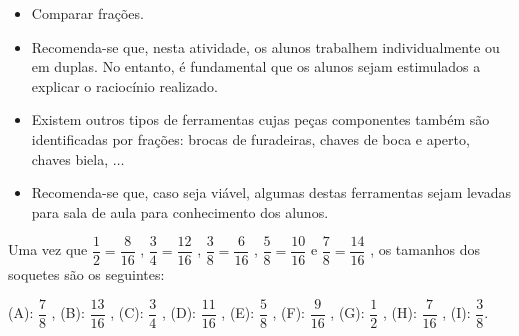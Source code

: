 \clearpage

\begin{atividade}\label{chap4-ativ14}
\objetivos
\begin{itemize} %
    \item       Comparar frações.
\end{itemize} %

\discussoes
\begin{itemize} %
    \item       Recomenda-se que, nesta atividade, os alunos trabalhem
individualmente ou em duplas. No entanto, é fundamental que os alunos sejam
estimulados a explicar o raciocínio realizado.
    \item       Existem outros tipos de ferramentas cujas peças componentes
também são identificadas por frações: brocas de furadeiras, chaves de boca e
aperto, chaves biela,       $\ldots$
    \item       Recomenda-se que, caso seja viável, algumas destas ferramentas
sejam levadas para sala de aula para conhecimento dos alunos.
\end{itemize} %

\solucao
  Uma vez que   $\dfrac{1}{2} = \dfrac{8}{16}$  ,   $\dfrac{3}{4} = \dfrac{12}{16}$
,   $\dfrac{3}{8} = \dfrac{6}{16}$  ,   $\dfrac{5}{8} = \dfrac{10}{16}$   e
$\dfrac{7}{8} = \dfrac{14}{16}$  , os tamanhos dos soquetes são os seguintes:

  (A):   $\dfrac{7}{8}$  ,
  (B):   $\dfrac{13}{16}$  ,
  (C):   $\dfrac{3}{4}$  ,
  (D):   $\dfrac{11}{16}$  ,
  (E):   $\dfrac{5}{8}$  ,
  (F):   $\dfrac{9}{16}$  ,
  (G):   $\dfrac{1}{2}$  ,
  (H):   $\dfrac{7}{16}$  ,
  (I):   $\dfrac{3}{8}$.

\end{atividade}


